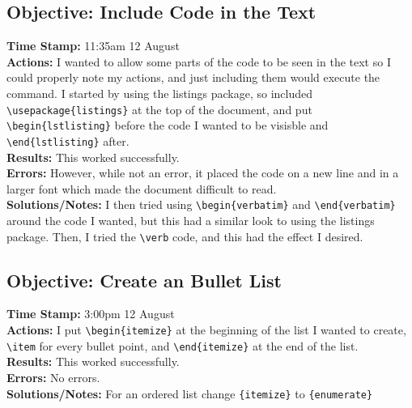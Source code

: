 \documentclass{article}
\begin{document}
\begin{FlushLeft}
\subsection{Objective: Include Code in the Text}
\textbf{Time Stamp:} 11:35am 12 August\\
\textbf{Actions:} I wanted to allow some parts of the code to be seen in the text so I could properly note my actions, and just including them would execute the command. I started by using the listings package, so included\\ \verb|\usepackage{listings}| at the top of the document, and put \verb|\begin{lstlisting}| before the code I wanted to be visisble and \verb|\end{lstlisting}| after.\\
\textbf{Results:} This worked successfully.\\
\textbf{Errors:} However, while not an error, it placed the code on a new line and in a larger font which made the document difficult to read.\\
\textbf{Solutions/Notes:} I then tried using \verb|\begin{verbatim}| and \verb|\end{verbatim}| around the code I wanted, but this had a similar look to using the listings package. Then, I tried the \verb|\verb| code, and this had the effect I desired.

\subsection{Objective: Create an Bullet List}
\textbf{Time Stamp:} 3:00pm 12 August\\
\textbf{Actions:} I put \verb|\begin{itemize}| at the beginning of the list I wanted to create, \verb|\item| for every bullet point, and \verb|\end{itemize}| at the end of the list. \\
\textbf{Results:} This worked successfully.\\
\textbf{Errors:} No errors.\\
\textbf{Solutions/Notes:} For an ordered list change \verb|{itemize}| to \verb|{enumerate}|


\end{FlushLeft}
\end{document}
